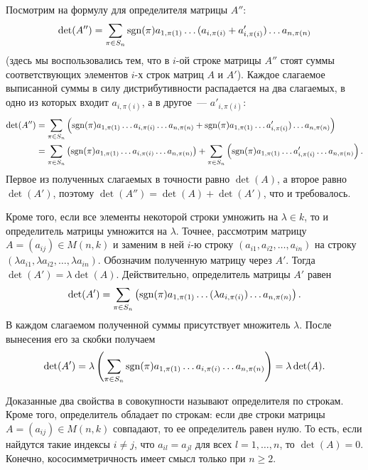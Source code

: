 Посмотрим на формулу для определителя матрицы
$A''$:
$$
\det(A'')=\sum_{\pi\in S_n} \operatorname{sgn}(\pi) a_{1,\pi(1)} \dots
(a_{i,\pi(i)}+a'_{i,\pi(i)}) \dots a_{n,\pi(n)}
$$
(здесь мы воспользовались тем, что в $i$-ой строке матрицы $A''$ стоят
суммы соответствующих элементов $i$-х строк матриц $A$ и $A'$). Каждое
слагаемое выписанной суммы в силу дистрибутивности распадается на два
слагаемых, в одно из которых входит $a_{i,\pi(i)}$, а в другое~---
$a'_{i,\pi(i)}$:
\begin{align*}
\det(A'')&=\sum_{\pi\in S_n}\left(\operatorname{sgn}(\pi) a_{1,\pi(1)} \dots
a_{i,\pi(i)} \dots a_{n,\pi(n)} + \operatorname{sgn}(\pi)a_{1,\pi(1)} \dots
a'_{i,\pi(i)}) \dots a_{n,\pi(n)}\right)\\
 &= \sum_{\pi\in S_n}\left(\operatorname{sgn}(\pi) a_{1,\pi(1)} \dots
a_{i,\pi(i)} \dots a_{n,\pi(n)}\right)
 + \sum_{\pi\in S_n}\left(\operatorname{sgn}(\pi) a_{1,\pi(1)} \dots
a'_{i,\pi(i)} \dots a_{n,\pi(n)}\right).
\end{align*}
Первое из полученных слагаемых в точности равно $\det(A)$, а второе
равно $\det(A')$, поэтому $\det(A'')=\det(A)+\det(A')$, что и
требовалось.

Кроме того, если все элементы некоторой строки умножить на $\lambda\in
k$, то и определитель матрицы умножится на $\lambda$. Точнее,
рассмотрим матрицу $A=(a_{ij})\in M(n,k)$ и заменим в ней $i$-ю строку
$(a_{i1},a_{i2},\dots,a_{in})$ на строку $(\lambda a_{i1}, \lambda
a_{i2}, \dots, \lambda a_{in})$. Обозначим полученную матрицу через
$A'$. Тогда $\det(A')=\lambda\det(A)$. Действительно, определитель
матрицы $A'$ равен
$$
\det(A') = \sum_{\pi\in S_n}\left(\operatorname{sgn}(\pi) a_{1,\pi(1)} \dots
(\lambda a_{i,\pi(i)}) \dots a_{n,\pi(n)}\right).
$$
В каждом слагаемом полученной суммы присутствует множитель
$\lambda$. После вынесения его за скобки получаем
$$
\det(A') = \lambda\left(\sum_{\pi\in S_n}\operatorname{sgn}(\pi) a_{1,\pi(1)} \dots
a_{i,\pi(i)} \dots a_{n,\pi(n)}\right) = \lambda\det(A).
$$


Доказанные два свойства в совокупности называют 
определителя по строкам. Кроме того, определитель обладает
 по
строкам:
если две строки матрицы $A=(a_{ij})\in M(n,k)$ совпадают, то ее
определитель равен
нулю. То есть, если найдутся такие индексы $i\neq j$, что
$a_{il}=a_{jl}$ для всех $l=1,\dots,n$, то $\det(A)=0$. Конечно,
кососимметричность имеет смысл только при $n\geq 2$.

